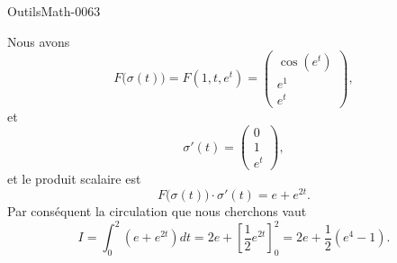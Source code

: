 
\begin{corrige}{OutilsMath-0063}

    Nous avons
    \begin{equation}
        F\big( \sigma(t) \big)=F(1,t,e^t)=\begin{pmatrix}
            \cos( e^{t})    \\ 
            e^1    \\ 
            e^t    
        \end{pmatrix},
    \end{equation}
    et
    \begin{equation}
        \sigma'(t)=\begin{pmatrix}
            0    \\ 
            1    \\ 
            e^t    
        \end{pmatrix},
    \end{equation}
    et le produit scalaire est
    \begin{equation}
        F\big( \sigma(t) \big)\cdot\sigma'(t)=e+e^{2t}.
    \end{equation}
    Par conséquent la circulation que nous cherchons vaut
    \begin{equation}
        I=\int_0^2(e+e^{2t})dt=2e+\left[ \frac{ 1 }{2} e^{2t} \right]_0^2=2e+\frac{ 1 }{2}(e^4-1).
    \end{equation}

\end{corrige}
